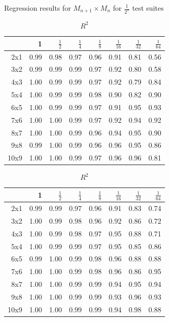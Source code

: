 \documentclass[conference]{IEEEtran}
\begin{document}
\begin{table}
\caption{Regression results for $M_{n+1}\times M_n$ for $\frac{1}{2^n}$ test suites}
\caption*{$R^2$}
  \begin{minipage}{.33\linewidth}
  \centering
{\small
\begin{tabular}{rrrrrrrr}
  \hline
 & 1 & $\frac{1}{2}$ & $\frac{1}{4}$ & $\frac{1}{8}$ & $\frac{1}{16}$ & $\frac{1}{32}$ & $\frac{1}{64}$ \\ 
  \hline
2x1 & 0.99 & 0.98 & 0.97 & 0.96 & 0.91 & 0.81 & 0.56 \\ 
  3x2 & 0.99 & 0.99 & 0.99 & 0.97 & 0.92 & 0.80 & 0.58 \\ 
  4x3 & 1.00 & 0.99 & 0.99 & 0.97 & 0.92 & 0.79 & 0.84 \\ 
  5x4 & 1.00 & 0.99 & 0.99 & 0.98 & 0.90 & 0.82 & 0.90 \\ 
  6x5 & 1.00 & 0.99 & 0.99 & 0.97 & 0.91 & 0.95 & 0.93 \\ 
  7x6 & 1.00 & 1.00 & 0.99 & 0.97 & 0.92 & 0.94 & 0.92 \\ 
  8x7 & 1.00 & 1.00 & 0.99 & 0.96 & 0.94 & 0.95 & 0.90 \\ 
  9x8 & 0.99 & 1.00 & 0.99 & 0.96 & 0.96 & 0.95 & 0.86 \\ 
  10x9 & 1.00 & 1.00 & 0.99 & 0.97 & 0.96 & 0.96 & 0.81 \\ 
   \hline
\end{tabular}
}


  \end{minipage}
  \begin{minipage}{.33\linewidth}
  \centering
{\small
\begin{tabular}{rrrrrrrr}
  \hline
 & 1 & $\frac{1}{2}$ & $\frac{1}{4}$ & $\frac{1}{8}$ & $\frac{1}{16}$ & $\frac{1}{32}$ & $\frac{1}{64}$ \\ 
  \hline
2x1 & 0.99 & 0.99 & 0.97 & 0.96 & 0.91 & 0.83 & 0.74 \\ 
  3x2 & 1.00 & 0.99 & 0.98 & 0.96 & 0.92 & 0.86 & 0.72 \\ 
  4x3 & 1.00 & 0.99 & 0.98 & 0.97 & 0.95 & 0.88 & 0.71 \\ 
  5x4 & 1.00 & 0.99 & 0.99 & 0.97 & 0.95 & 0.85 & 0.86 \\ 
  6x5 & 0.99 & 1.00 & 0.99 & 0.98 & 0.96 & 0.88 & 0.88 \\ 
  7x6 & 1.00 & 1.00 & 0.99 & 0.98 & 0.96 & 0.86 & 0.95 \\ 
  8x7 & 1.00 & 1.00 & 0.99 & 0.99 & 0.94 & 0.95 & 0.94 \\ 
  9x8 & 1.00 & 1.00 & 0.99 & 0.99 & 0.93 & 0.96 & 0.93 \\ 
  10x9 & 1.00 & 1.00 & 0.99 & 0.99 & 0.94 & 0.98 & 0.88 \\ 
   \hline
\end{tabular}
}



\end{minipage}
\end{table}
\end{document}
